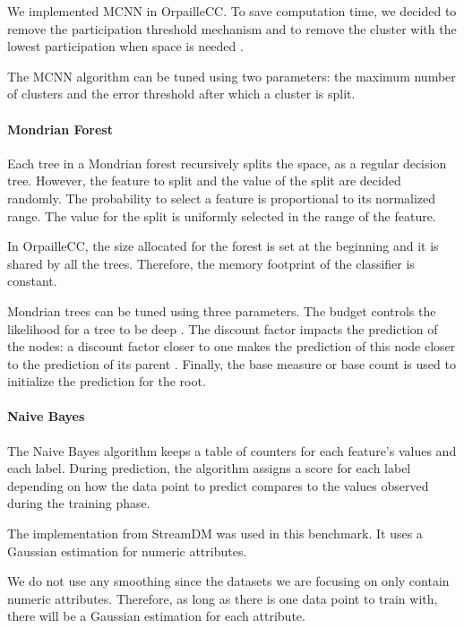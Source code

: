 We implemented MCNN in OrpailleCC. To save computation time, we decided to remove the
participation threshold mechanism and to remove the
cluster with the lowest participation
when space is needed . 

The MCNN algorithm can be tuned using two
parameters: the maximum number of clusters and the
error threshold after which a cluster is split.


\paragraph{Mondrian Forest~\cite{mondrian2014}}
Each tree in a Mondrian forest recursively
splits the space, as a regular decision tree.
However, the feature to split and the value of the
split are decided randomly. The probability to select a feature is 
proportional to its normalized range. The value for the split is
uniformly selected in the range of the feature.

In OrpailleCC, the size allocated for the forest
is set at the beginning and it is shared by all
the trees.  Therefore, the memory footprint of the
classifier is constant.

Mondrian trees can be tuned using three
parameters. The budget controls the
likelihood for a tree to be deep .  The discount
factor impacts the prediction of the nodes: a
discount factor closer to one makes the prediction
of this node closer to the prediction of its
parent . Finally, the base measure or base count is
used to initialize the prediction for the root.

\paragraph{Naive Bayes~\cite{naive_bayes}}
The Naive Bayes algorithm keeps a table of
counters for each feature's values and each label.
During prediction, the algorithm assigns a
score for each label depending on how the data
point to predict compares to the values observed
during the training phase.

The implementation from StreamDM was used in this
benchmark. It uses a Gaussian
estimation for numeric attributes.

We do not use any smoothing  since the datasets
we are focusing on only contain numeric
attributes. Therefore, as long as there is one data
point to train with, there will be a Gaussian
estimation for each attribute.

